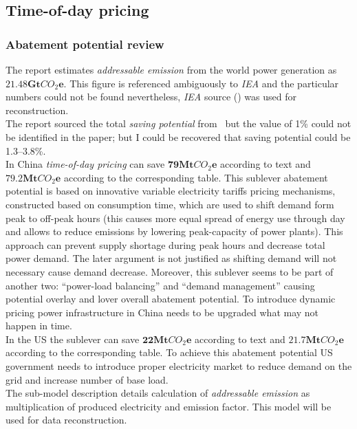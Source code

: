\documentclass[11pt, twocolumn]{article}
\begin{document}
\subsection{Time-of-day pricing}
\subsubsection{Abatement potential review}
The report estimates \emph{addressable emission} from the world power generation as $\mathbf{21.48Gt}CO_2\mathbf{e}$. This figure is referenced ambiguously to \emph{IEA} and the particular numbers could not be found nevertheless, \emph{IEA} source (\citep{iea2012co2}) was used for reconstruction.\\
The report sourced the total \emph{saving potential} from~\citep{pratt2010smart} but the value of 1\% could not be identified in the paper; but I could be recovered that saving potential could be 1.3--3.8\%.\\

In China \emph{time-of-day pricing} can save $\mathbf{79} \mathbf{Mt}CO_2\mathbf{e}$ according to text and $\mathbf{79.2} \mathbf{Mt}CO_2\mathbf{e}$ according to the corresponding table. This sublever abatement potential is based on innovative variable electricity tariffs pricing mechanisms, constructed based on consumption time, which are used to shift demand form peak to off-peak hours (this causes more equal spread of energy use through day and allows to reduce emissions by lowering peak-capacity of power plants). This approach can prevent supply shortage during peak hours and decrease total power demand. The later argument is not justified as shifting demand will not necessary cause demand decrease. Moreover, this sublever seems to be part of another two: ``power-load balancing'' and ``demand management'' causing potential overlay and lover overall abatement potential. To introduce dynamic pricing power infrastructure in China needs to be upgraded what may not happen in time.\\

In the US the sublever can save $\mathbf{22} \mathbf{Mt}CO_2\mathbf{e}$ according to text and $\mathbf{21.7} \mathbf{Mt}CO_2\mathbf{e}$ according to the corresponding table. To achieve this abatement potential US government needs to introduce proper electricity market to reduce demand on the grid and increase number of base load.\\
The sub-model description details calculation of \emph{addressable emission} as multiplication of produced electricity and emission factor. This model will be used for data reconstruction.\\
\end{document}
